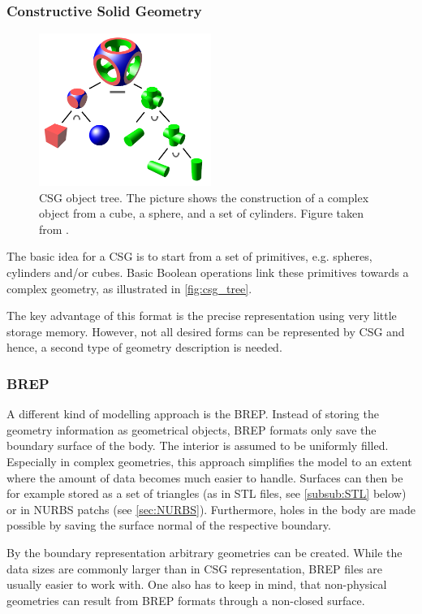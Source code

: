 \subsubsection{Constructive Solid Geometry}
\begin{figure}
\centering
\includegraphics[width=0.5\textwidth]{Pictures/Csg_tree.png}
\caption{\ac{CSG} object tree. The picture shows the construction of a complex object from a cube, a sphere, and a set of cylinders. Figure taken from \cite{WikipediaCSG}.}
\label{fig:csg_tree}
\end{figure}
The basic idea for a CSG is to start from a set of primitives, e.g. spheres, cylinders and/or cubes. Basic Boolean operations link these primitives towards a complex geometry, as illustrated in \autoref{fig:csg_tree}.

The key advantage of this format is the precise representation using very little storage memory. However, not all desired forms can be represented by \ac{CSG} and hence, a second type of geometry description is needed. 
\subsubsection{\Acl{BREP}}
A different kind of modelling approach is the \ac{BREP}. Instead of storing the geometry information as geometrical objects, \ac{BREP} formats only save the boundary surface of the body. The interior is assumed to be uniformly filled. Especially in complex geometries, this approach simplifies the model to an extent where the amount of data becomes much easier to handle. Surfaces can then be for example stored as a set of triangles (as in \ac{STL} files, see \autoref{subsub:STL} below) or in \ac{NURBS} \acsp{patch} (see \autoref{sec:NURBS}).
Furthermore, holes in the body are made possible by saving the surface normal of the respective boundary. 

By the boundary representation arbitrary geometries can be created. While the data sizes are commonly larger than in \ac{CSG} representation, \ac{BREP} files are usually easier to work with. One also has to keep in mind, that non-physical geometries can result from \ac{BREP} formats through a non-closed surface.
